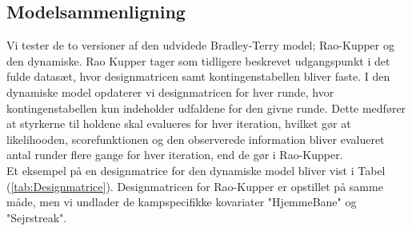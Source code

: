 \documentclass[11pt,a4paper]{article}
\begin{document}
\subsection{Modelsammenligning}
Vi tester de to versioner af den udvidede Bradley-Terry model; Rao-Kupper og den dynamiske. Rao Kupper tager som tidligere beskrevet udgangspunkt i det fulde datasæt, hvor designmatricen samt kontingenstabellen bliver faste. I den dynamiske model opdaterer vi designmatricen for hver runde, hvor kontingenstabellen kun indeholder udfaldene for den givne runde. Dette medfører at styrkerne til holdene skal evalueres for hver iteration, hvilket gør at likelihooden, scorefunktionen og den observerede information bliver evalueret antal runder flere gange for hver iteration, end de gør i Rao-Kupper.\\
Et eksempel på en designmatrice for den dynamiske model bliver vist i Tabel (\ref{tab:Designmatrice}). Designmatricen for Rao-Kupper er opstillet på samme måde, men vi undlader de kampspecifikke kovariater "HjemmeBane" og "Sejrstreak". 
\end{document}
